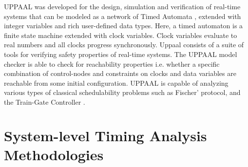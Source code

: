 UPPAAL \cite{larsen1997uppaal, bengtsson1996uppaal, david2009model} was developed for the design, simulation and verification of real-time systems that can be modeled as a network of Timed Automata \cite{Alur1994}, extended with integer variables and rich user-defined data types. Here, a timed automaton is a finite state machine extended with clock variables. Clock variables evaluate to real numbers and all clocks progress synchronously. Uppaal consists of a suite of tools for verifying safety properties of real-time systems. The UPPAAL model checker is able to check for reachability properties i.e. whether a specific combination of control-nodes and constraints on clocks and data variables are reachable from some initial configuration. UPPAAL is capable of analyzing various types of classical schedulability problems such as Fischer' protocol, and the Train-Gate Controller \cite{bengtsson1996uppaal}.




\section{System-level Timing Analysis Methodologies}


